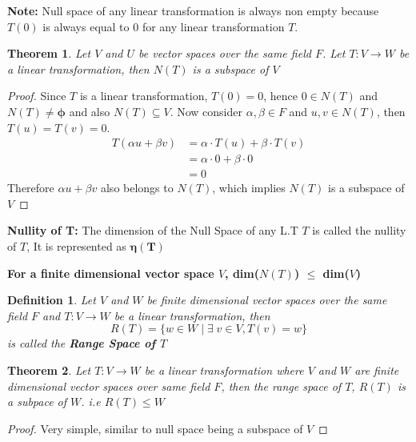 \documentclass[a4paper, titlepage]{article}
\newtheorem{theorem}{Theorem}[section]
\newtheorem{definition}{Definition}[section]
\begin{document}
        \noindent\textbf{Note:} Null space of any linear transformation is always
        non empty because $T(0)$ is always equal to $0$ for any linear 
        transformation $T$.

        \begin{theorem}
            Let $V$ and $U$ be vector spaces over the same field $F$. 
            Let $T: V \rightarrow W$ be a linear transformation, then
            $N(T)$ is a subspace of $V$
        \end{theorem}
        \begin{proof}
            Since $T$ is a linear transformation, $T(0) = 0$, hence
            $0 \in N(T)$ and $N(T) \neq \bm{\phi}$ and also 
            $N(T) \subseteq V$. Now consider $\alpha, \beta \in F$ and 
            $u, v \in N(T)$, then $T(u) = T(v) = 0$.
            \begin{align*}
                T(\alpha u + \beta v) &= \alpha\cdot T(u) + \beta\cdot T(v) \\
                                                  &= \alpha\cdot 0 + \beta\cdot 0 \\
                                                  &= 0
            \end{align*}
            Therefore $\alpha u + \beta v$ also belongs to $N(T)$, which
            implies $N(T)$ is a subspace of $V$
        \end{proof}
        
        \noindent \textbf{Nullity of T: }The dimension of the Null
        Space of any L.T $T$ is called the nullity of $T$, It is 
        represented as $\bm{\eta(T)}$
        
        \noindent \textbf{For a finite dimensional vector space 
        $V$, dim($N(T)$) $\le$ dim($V$)}
        
        \begin{definition}
            Let $V$ and $W$ be finite dimensional vector spaces over the
            same field $F$ and $T:V \to W$ be a linear transformation,
            then
            $$R(T) = \{ w \in W \; | \; \exists \; v \in V, T(v) = w \}$$
            is called the \textbf{Range Space of $T$}
        \end{definition}

        \begin{theorem}
            Let $T: V \to W$ be a linear transformation where $V$ 
            and $W$ are finite dimensional vector spaces over same
            field $F$, then the range space of $T$, $R(T)$ is a 
            subpace of $W$. i.e $R(T) \le W$
        \end{theorem}
        \begin{proof}
            Very simple, similar to null space being a subspace of $V$
        \end{proof}
\end{document}
